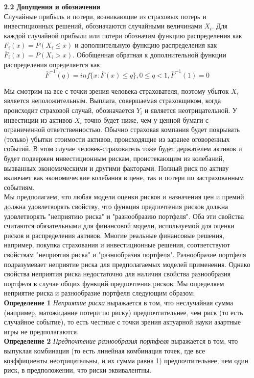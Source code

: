 \documentclass[12pt,a4paper]{article}
\begin{document}
{\bf \large 2.2  Допущения и обозначения}\\
Случайные прибыль и потери, возникающие из страховых потерь и инвестиционных решений, обозначаются случайными величинами $X_i.$ Для каждой случайной прибыли или потери обозначим функцию распределения как $F_i(x)=P(X_i \leq x) $ и дополнительную функцию распределения как ${\overline F_i}(x)=P(X_i > x).$ Обобщенная обратная к дополнительной функции распределения определяется как 
$${\overline F^{-1}}(q) = inf\{x: {\overline F}(x) \leq q\}, 0 \leq q < 1, {\overline F^{-1}}(1)=0$$

Мы смотрим на все с точки зрения человека-страхователя, поэтому убыток $X_i$ является неположительным.  Выплата, совершаемая страховщиком, когда происходит страховой случай, обозначается $Y_i$ и является неотрицательной. 
У инвестиции из активов $X_i$ точно будет ниже, чем у ценной бумаги с ограниченной ответственностью. Обычно страховая компания будет покрывать (только)  убытки стоимости активов, происходящие из заранее оговоренных событий. В этом случае человек-страхователь тоже будет держателем активов и будет подвержен инвестиционным рискам, проистекающим из колебаний, вызванных экономическими и другими факторами. Полный риск по активу включает как экономические колебания в цене, так и потери по застрахованным событиям.\\
Мы предполагаем, что любая модели оценки рисков и назначения цен и премий должна удовлетворять свойству, что функция предпочтения рисков должна удовлетворять "неприятию риска" и "разнообразию портфеля".  Оба эти свойства считаются обязательными для финансовой модели, используемой для оценки рисков и распределения активов. Многие реальные финансовые решения, например, покупка страхования и инвестиционные решения, соответствуют  свойствам  "неприятия риска" и "разнообразия портфеля". Разнообразие портфеля подразумевает неприятие риска для предполагаемых моделей применения. Однако свойства неприятия риска недостаточно для наличия свойства разнообразия портфеля в случае общих функций предпочтения рисков. Мы определяем неприятие риска и разнообразие портфеля следующим образом:\\
{\bf Определение 1} { \itshape Неприятие риска }выражается в том, что неслучайная сумма (например, матожидание потери по риску) предпочтительнее, чем риск (то есть случайное событие), то есть честные с точки зрения актуарной науки азартные игры не предполагаются.\\
{\bf Определение 2} { \itshape Предпочтение разнообразия портфеля } выражается в том, что выпуклая комбинация (то есть линейная комбинация точек, где все коэффициенты неотрицательны, и их сумма равна 1) предпочтительнее, чем один риск, в предположении, что риски эквивалентны.\\
\end{document}
